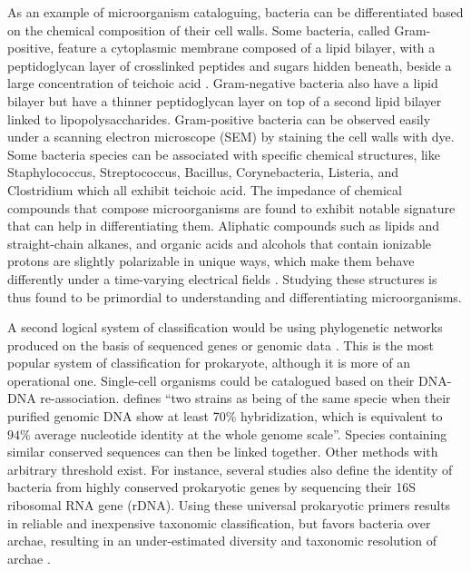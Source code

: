 As an example of microorganism cataloguing, bacteria can be differentiated based on the chemical composition of their cell walls. Some bacteria, called Gram-positive, feature a cytoplasmic membrane composed of a lipid bilayer, with a peptidoglycan layer of crosslinked peptides and sugars hidden beneath, beside a large concentration of teichoic acid \cite{Kocanda2014}. Gram-negative bacteria also have a lipid bilayer but have a thinner peptidoglycan layer on top of a second lipid bilayer linked to lipopolysaccharides. Gram-positive bacteria can be observed easily under a scanning electron microscope (SEM) by staining the cell walls with dye. Some bacteria species can be associated with specific chemical structures, like Staphylococcus, Streptococcus, Bacillus, Corynebacteria, Listeria, and Clostridium which all exhibit teichoic acid. The impedance of chemical compounds that compose microorganisms are found to exhibit notable signature that can help in differentiating them. Aliphatic compounds such as lipids and straight-chain alkanes, and organic acids and alcohols that contain ionizable protons are slightly polarizable in unique ways, which make them behave differently under a time-varying electrical fields \cite{Kocanda2014}. Studying these structures is thus found to be primordial to understanding and differentiating microorganisms.\par

A second logical system of classification would be using phylogenetic networks produced on the basis of sequenced genes or genomic data \cite{kapli2020phylogenetic}. This is the most popular system of classification for prokaryote, although it is more of an operational one. Single-cell organisms could be catalogued based on their DNA-DNA re-association. \citep{konstantinidis2005genomic} defines “two strains as being of the same specie when their purified genomic DNA show at least 70\% hybridization, which is equivalent to $94\%$ average nucleotide identity at the whole genome scale”. Species containing similar conserved sequences can then be linked together. Other methods with arbitrary threshold exist. For instance, several studies also define the identity of bacteria from highly conserved prokaryotic genes by sequencing their 16S ribosomal RNA gene (rDNA). Using these universal prokaryotic primers results in reliable and inexpensive taxonomic classification, but favors bacteria over archae, resulting in an under-estimated diversity and taxonomic resolution of archae \cite{Horve2020, Xu2006}. \par

